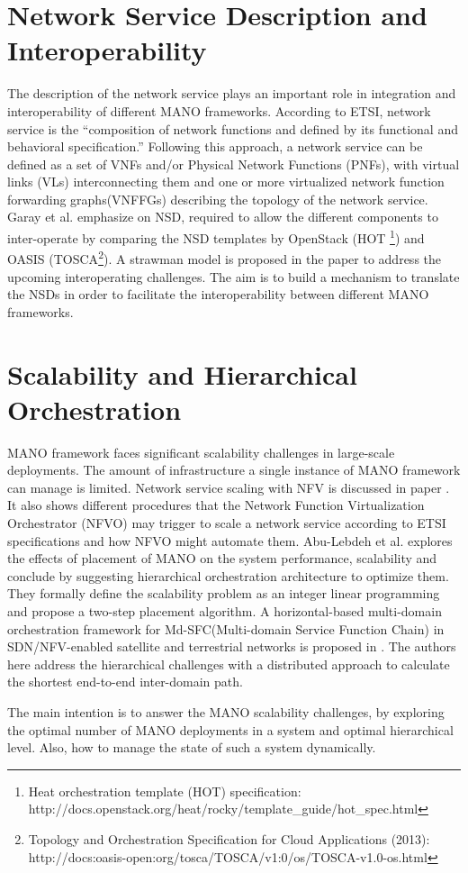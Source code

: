 \section{Network Service Description and Interoperability}
\label{serviceDescription}
The description of the network service plays an important role in integration and interoperability of different MANO frameworks. According to ETSI, network service is the “composition of network functions and defined by its functional and behavioral specification.” Following this approach, a network service can be defined as a set of VNFs and/or Physical Network Functions (PNFs), with virtual links (VLs) interconnecting them and one or more virtualized network function forwarding graphs(VNFFGs) describing the topology of the network service.\\

Garay et al. \cite{garay_service_2016} emphasize on NSD, required to allow the different components to inter-operate by comparing the NSD templates by OpenStack (HOT \footnote{Heat orchestration template (HOT) specification:        \\http://docs.openstack.org/heat/rocky/template\_guide/hot\_spec.html}) and OASIS (TOSCA\footnote{Topology and Orchestration Specification for Cloud Applications (2013):\\ http://docs:oasis-open:org/tosca/TOSCA/v1:0/os/TOSCA-v1.0-os.html}). A strawman model is proposed in the paper to address the upcoming interoperating challenges. The aim is to build a mechanism to translate the NSDs in order to facilitate the interoperability between different MANO frameworks.




\section{Scalability and Hierarchical Orchestration}
\label{manoscale}

MANO framework faces significant scalability challenges in large-scale deployments. The amount of infrastructure a single instance of MANO framework can manage is limited. Network service scaling with NFV is discussed in paper \cite{adamuz2018automated}. It also shows different procedures that the Network Function Virtualization Orchestrator (NFVO) may trigger to scale a network service according to ETSI specifications and how NFVO might automate them. Abu-Lebdeh et al. \cite{abu-lebdeh_nfv_2017} explores the effects of placement of MANO on the system performance, scalability and conclude by suggesting hierarchical orchestration architecture to optimize them. They formally define the scalability problem as an integer linear programming and propose a two-step placement algorithm. 
A horizontal-based multi-domain orchestration framework for  Md-SFC(Multi-domain Service Function Chain) in SDN/NFV-enabled satellite and terrestrial networks is proposed in \cite{li_horizontal-based_2018}. The authors here address the hierarchical challenges with a distributed approach to calculate the shortest end-to-end inter-domain path.  

The main intention is to answer the MANO scalability challenges, by exploring the optimal number of MANO deployments in a system and optimal hierarchical level. Also, how to manage the state of such a system dynamically.
